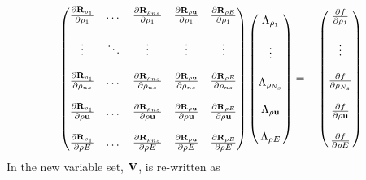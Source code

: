 \begin{equation}
  \begin{pmatrix}
    \rdiff{\rho_1}{\rho_1}    & \dots  & \rdiff{\rho_{ns}}{\rho_1}    & \rdiff{\rho \vu}{\rho_1}    & \rdiff{\rho E}{\rho_1}    \\ \\
    \vdots                    & \ddots & \vdots                       & \vdots                      & \vdots                    \\ \\
    \rdiff{\rho_1}{\rho_{ns}} & \dots  & \rdiff{\rho_{ns}}{\rho_{ns}} & \rdiff{\rho \vu}{\rho_{ns}} & \rdiff{\rho E}{\rho_{ns}} \\ \\
    \rdiff{\rho_1}{\rho \vu}  & \dots  & \rdiff{\rho_{ns}}{\rho \vu}  & \rdiff{\rho \vu}{\rho \vu}  & \rdiff{\rho E}{\rho \vu}  \\ \\
    \rdiff{\rho_1}{\rho E}    & \dots  & \rdiff{\rho_{ns}}{\rho E}    & \rdiff{\rho \vu}{\rho E}    & \rdiff{\rho E}{\rho E}
  \end{pmatrix}
  \begin{pmatrix}
    \adjlam{\rho_1}     \\ \\
    \vdots              \\ \\
    \adjlam{\rho_{N_s}} \\ \\
    \adjlam{\rho \vu}   \\ \\
    \adjlam{\rho E}
  \end{pmatrix}
  = -
  \begin{pmatrix}
    \pd{f}{\rho_1}     \\ \\
    \vdots           \\ \\
    \pd{f}{\rho_{N_s}} \\ \\
    \pd{f}{\rho \vu}   \\ \\
    \pd{f}{\rho E}
  \end{pmatrix}
  \label{fc-adj}
\end{equation}
In the new variable set, $\mathbf V$,  is re-written as
